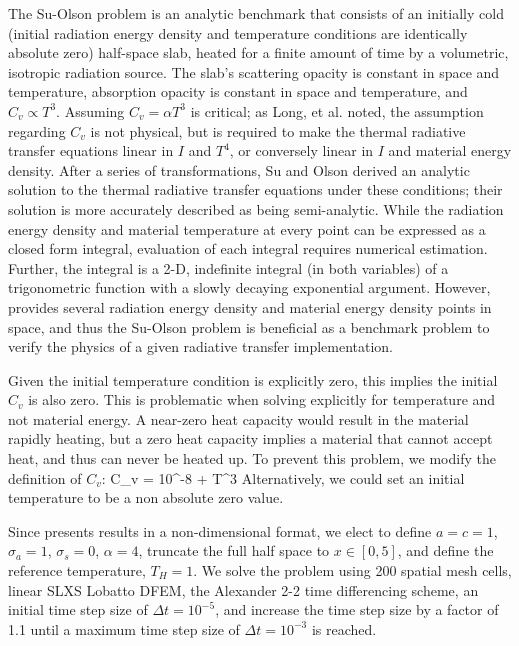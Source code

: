 The Su-Olson problem \cite{su_olson_1} is an analytic benchmark that consists of an initially cold (initial radiation energy density and temperature conditions are identically absolute zero) half-space slab, heated for a finite amount of time by a volumetric, isotropic radiation source.
The slab's scattering opacity is constant in space and temperature, absorption opacity is constant in space and temperature, and $C_v \propto T^3$.
Assuming $C_v = \alpha T^3$ is critical; as Long, et al. \cite{alex_paper} noted, the assumption regarding $C_v$ is not physical, but is required to make the thermal radiative transfer equations linear in $I$ and $T^4$, or conversely linear in $I$ and material energy density. 
After a series of transformations, Su and Olson derived an analytic solution to the thermal radiative transfer equations under these conditions; their solution is more accurately described as being semi-analytic.
While the radiation energy density and material temperature at every point can be expressed as a closed form integral, evaluation of each integral requires numerical estimation.
Further, the integral is a 2-D, indefinite integral (in both variables) of a trigonometric function with a slowly  decaying exponential argument.
However, \cite{su_olson_1} provides several radiation energy density and material energy density points in space, and thus the Su-Olson problem is beneficial as a benchmark problem to verify the physics of a given radiative transfer implementation.

Given the initial temperature condition is explicitly zero, this implies the initial $C_v$ is also zero.
This is problematic when solving explicitly for temperature and not material energy.
A near-zero heat capacity would result in the material rapidly heating, but a zero heat capacity implies a material that cannot accept heat, and thus can never be heated up.
To prevent this problem, we modify the definition of $C_v$:
\benum
C_v = 10^{-8} + \alpha T^3 \pep
\eenum
Alternatively, we could set an initial temperature to be a non absolute zero value.

Since \cite{su_olson_1} presents results in a non-dimensional format, we elect to define $a=c=1$, $\sigma_a = 1$, $\sigma_s=0$, $\alpha = 4$, truncate the full half space to $x\in[0,5]$, and define the reference temperature, $T_H = 1$.
We solve the problem using 200 spatial mesh cells, linear SLXS Lobatto DFEM, the Alexander 2-2 time differencing scheme, an initial time step size of $\Delta t = 10^{-5}$, and increase the time step size by a factor of 1.1 until a maximum time step size of $\Delta t = 10^{-3}$ is reached.

